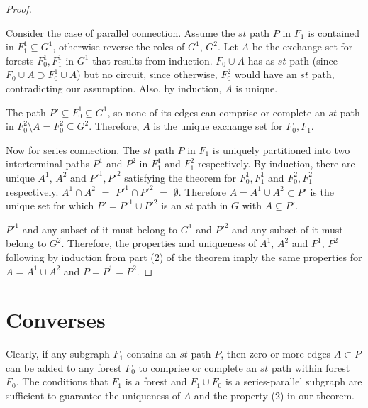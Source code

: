 \documentclass[12pt,leqno]{amsart}
\begin{document}
\begin{proof}
\begin{center}

\end{center}

Consider the case of parallel connection.  
Assume the $st$ path $P$ in $F_1$ is contained
in $F_1^1\subseteq G^1$, otherwise reverse the roles of $G^1$, $G^2$.
Let $A$ be the exchange set for forests $F_0^1,F_1^1$ in 
$G^1$ that results from induction.  $F_0\cup A$ 
has as $st$ path (since $F_0\cup A \supset F_0^1\cup A$) 
but no circuit, since otherwise, $F_0^2$ would
have an $st$ path, contradicting our assumption.  Also, by
induction, $A$ is unique.

The path $P'\subseteq F_0^1\subseteq G^1$, so none of 
its edges can comprise or complete an $st$ path in 
$F_0^2\setminus A = F_0^2 \subseteq G^2$.  Therefore,
$A$ is the unique exchange set for $F_0,F_1$.

\begin{center}

\end{center}


Now for series connection.  
The $st$ path $P$ in $F_1$ is uniquely
partitioned into two interterminal paths $P^1$ and 
$P^2$ in $F_1^1$ and $F_1^2$ respectively.  By induction,
there are unique $A^1$, $A^2$ and $P'^1, P'^2$ satisfying the theorem
for $F_0^1,F_1^1$ and $F_0^2,F_1^2$ respectively.
$A^1\cap A^2$ $=$ $P'^1\cap P'^2$ $=$ $\emptyset$.
Therefore $A=A^1\cup A^2\subset P'$ is the unique set
for which 
$P'=P'^1\cup P'^2$ is an $st$ path in $G$ with
$A\subseteq P'$.

$P'^1$ and any subset of it must belong to $G^1$ and
$P'^2$ and any subset of it must belong to $G^2$.  Therefore,
the properties and uniqueness of $A^1$, $A^2$ and
$P^1$, $P^2$ following by induction from part (2) of the
theorem imply the same properties for $A=A^1\cup A^2$ and
$P=P^1=P^2$.
\end{proof}


\section{Converses}

Clearly, if any subgraph $F_1$ contains an $st$ path $P$, then zero or more
edges $A\subset P$ can be added to any forest $F_0$ to comprise or
complete an $st$ path within forest $F_0$.  The conditions that
$F_1$ is a forest and $F_1\cup F_0$ is a series-parallel subgraph
are sufficient to guarantee the uniqueness of $A$ and the
property (2) in our theorem.
\end{document}
